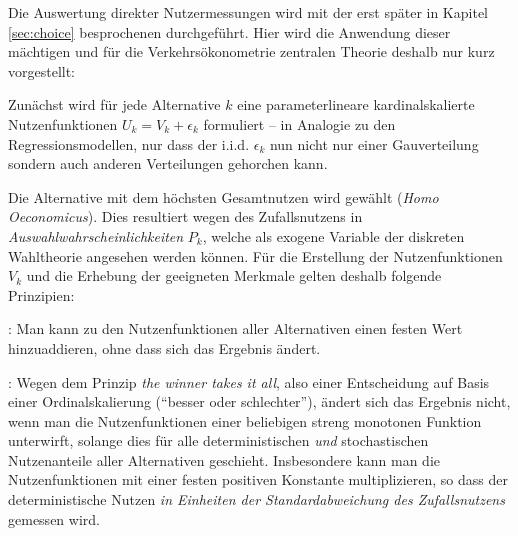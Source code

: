 \noindent
Die Auswertung direkter Nutzermessungen wird mit der erst sp\"ater in
Kapitel \ref{sec:choice} besprochenen 
durch\-gef\"uhrt. Hier wird die Anwendung  dieser m\"achtigen
und f\"ur die Verkehrs\"okonometrie zentralen Theorie deshalb nur kurz
vorgestellt:
\bi
\item Zun\"achst wird f\"ur jede Alternative $k$ eine parameterlineare 
kardinalskalierte 
Nutzenfunktionen $U_k=V_k+\epsilon_k$ formuliert -- in Analogie zu den
Regressionsmodellen, nur dass der i.i.d.  $\epsilon_k$
nun nicht nur einer Gau\3verteilung sondern auch anderen Verteilungen
gehorchen kann.
\item Die Alternative mit dem h\"ochsten
  Gesamtnutzen wird gew\"ahlt (\emph{Homo Oeconomicus}). Dies resultiert
  wegen des Zufallsnutzens in 
  \emph{Auswahlwahrscheinlichkeiten} $P_k$, welche als exogene
  Variable der diskreten Wahltheorie angesehen werden k\"onnen.
\ei
%
F\"ur die Erstellung der  Nutzenfunktionen $V_k$ und die
Erhebung der geeigneten Merkmale gelten deshalb folgende Prinzipien:
\bi
\item {}: Man kann zu den
  Nutzenfunktionen aller Alternativen 
einen festen Wert hinzuaddieren, ohne dass sich das
  Ergebnis  \"andert.
\item {}: Wegen dem Prinzip \emph{the winner takes
  it all}, also einer Entscheidung auf Basis einer 
Ordinalskalierung (``besser oder schlechter''), \"andert sich das
Ergebnis nicht, wenn man die
Nutzenfunktionen einer beliebigen  streng
  monotonen Funktion unterwirft, solange dies f\"ur alle
  deterministischen \emph{und} stochastischen Nutzenanteile aller
  Alternativen geschieht. Insbesondere kann man die Nutzenfunktionen
  mit einer festen positiven Konstante multiplizieren, so dass der
  deterministische Nutzen \emph{in Einheiten der Standardabweichung
    des Zufallsnutzens} gemessen wird.
\ei

